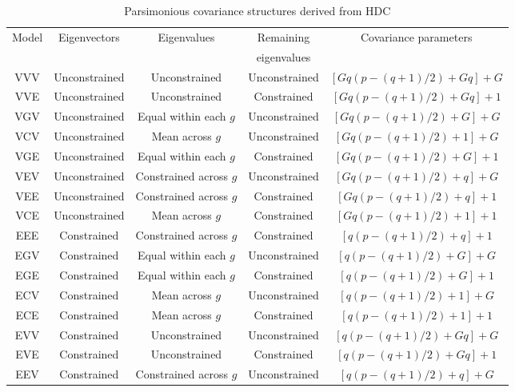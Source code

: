 \documentclass[11pt]{article}
\begin{document}
\begin {table}
\caption {Parsimonious covariance structures derived from HDC} \label{tab:title} 
\def\arraystretch{1.2}
\begin{center}
\begin{tabular}{ |c|c|c|c|c| } 
\hline
Model & Eigenvectors & Eigenvalues & Remaining & Covariance parameters \\
& & & eigenvalues & \\
\hline
VVV & Unconstrained & Unconstrained & Unconstrained & $[Gq( p - (q+1)/2 )+Gq]+G$ \\ 
VVE & Unconstrained & Unconstrained & Constrained & $[Gq( p - (q+1)/2 )+Gq]+1$ \\ 
VGV & Unconstrained & Equal within each $g$ & Unconstrained & $[Gq( p - (q+1)/2 )+G]+G$ \\ 
VCV & Unconstrained & Mean across $g$ & Unconstrained & $[Gq( p - (q+1)/2 )+1]+G$ \\ 
VGE & Unconstrained & Equal within each $g$& Constrained & $[Gq( p - (q+1)/2 )+G]+1$ \\ 
VEV & Unconstrained & Constrained across $g$ & Unconstrained & $[Gq( p - (q+1)/2 )+q]+G$ \\ 
VEE & Unconstrained & Constrained across $g$ & Constrained & $[Gq( p - (q+1)/2 )+q]+1$ \\ 
VCE & Unconstrained & Mean across $g$ & Constrained & $[Gq( p - (q+1)/2 )+1]+1$ \\
EEE & Constrained & Constrained across $g$ & Constrained & $[q( p - (q+1)/2 )+q]+1$ \\
EGV & Constrained & Equal within each $g$ & Unconstrained & $[q( p - (q+1)/2 )+G]+G$ \\
EGE & Constrained & Equal within each $g$ & Constrained & $[q( p - (q+1)/2 )+G]+1$ \\
ECV & Constrained & Mean across $g$ & Unconstrained & $[q( p - (q+1)/2 )+1]+G$ \\
ECE & Constrained & Mean across $g$ & Constrained & $[q( p - (q+1)/2 )+1]+1$ \\
EVV & Constrained & Unconstrained & Unconstrained & $[q( p - (q+1)/2 )+Gq]+G$ \\
EVE & Constrained & Unconstrained & Constrained & $[q( p - (q+1)/2 )+Gq]+1$ \\
EEV & Constrained & Constrained across $g$ & Unconstrained & $[q( p - (q+1)/2 )+q]+G$ \\
\hline
\end{tabular}
\end{center}
\end {table}\\
\\
\end{document}
